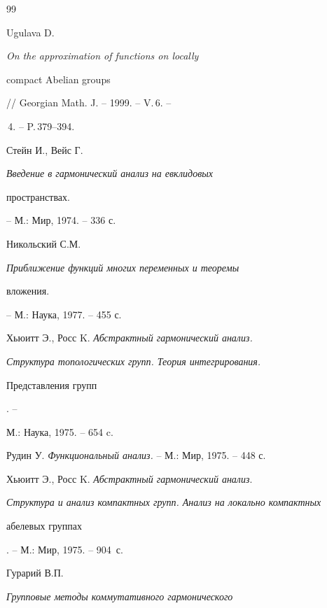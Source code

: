 \begin{thebibliography}{99}







Ugulava D. {\em On the approximation of functions on locally 


compact Abelian groups} // Georgian Math. J. -- 1999. -- V.\,6. -- 


\No\,4. -- P.\,379--394. 







Стейн И., Вейс Г. {\it Введение в гармонический анализ на евклидовых


пространствах.} -- М.: Мир, 1974. -- 336 с. 







Никольский С.М. {\it Приближение функций многих переменных и теоремы


вложения.} -- М.: Наука, 1977. -- 455 с. 







Хьюитт Э., Росс K. {\it Абстрактный гармонический анализ.} 


{\em Структура топологических групп. Теория интегрирования.


Представления групп}. --


М.: Наука, 1975. -- 654 c.







Рудин У. {\it Функциональный анализ.} -- М.: Мир, 1975. -- 448 с. 







Хьюитт Э., Росс K. {\it Абстрактный гармонический анализ}. 


{\em Структура и анализ компактных групп. Анализ на локально компактных


абелевых группах}. -- М.: Мир, 1975. -- 904~с. 







Гурарий В.П. {\it Групповые методы коммутативного гармонического 


}
\end{thebibliography}
